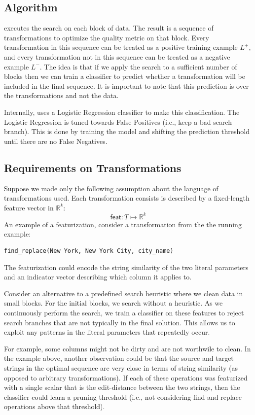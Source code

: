 \subsection{Algorithm }
\sys executes the search on each block of data.
The result is a sequence of transformations to optimize the quality metric on that block.
Every transformation in this sequence can be treated as a positive training example $L^+$, and every transformation not in this sequence can be treated as a negative example $L^-$.
The idea is that if we apply the search to a sufficient number of blocks then we can train a classifier to predict whether a transformation will be included in the final sequence.
It is important to note that this prediction is over the transformations and not the data. 

Internally, \sys uses a Logistic Regression classifier to make this classification. The Logistic Regression is tuned towards False Positives (i.e., keep a bad search branch). This is done by training the model and shifting the prediction threshold until there are no False Negatives. 


\subsection{Requirements on Transformations}
Suppose we made only the following assumption about the language of transformations used.
Each transformation consists is described by a fixed-length feature vector in $\mathbb{R}^k$:
\[
\textsf{feat}: T \mapsto \mathbb{R}^k 
\]
An example of a featurization, consider a transformation from the the running example:
\begin{lstlisting}
find_replace(New York, New York City, city_name)
\end{lstlisting}
The featurization could encode the string similarity of the two literal parameters and an indicator vector describing which column it applies to.

Consider an alternative to a predefined search heuristic where we clean data in small blocks.
For the initial blocks, we search without a heuristic.
As we continuously perform the search, we train a classifier on these features to reject search branches that are not typically in the final solution.
This allows us to exploit any patterns in the literal parameters that repeatedly occur.

For example, some columns might not be dirty and are not worthwile to clean.
In the example above, another observation could be that the source and target strings in the optimal sequence are very close in terms of string similarity (as opposed to arbitrary transformations).
If each of these operations was featurized with a single scalar that is the edit-distance between the two strings, then the classifier could learn a pruning threshold (i.e., not considering find-and-replace operations above that threshold).


